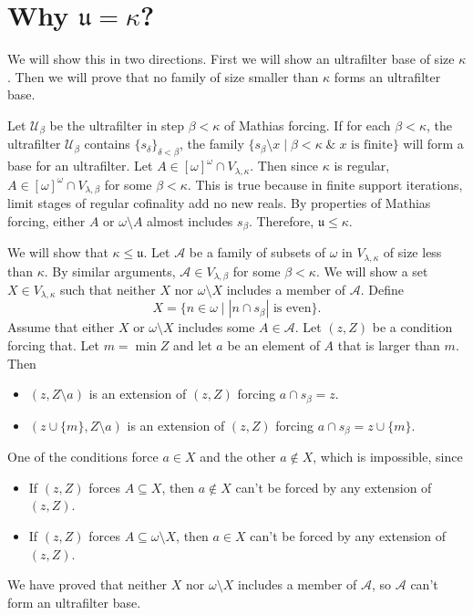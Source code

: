 \documentclass[12pt]{article}\usepackage[english]{babel}
\newcommand{\logand}{\; \& \;}
\newcommand{\calA}{\mathcal{A}}
\newcommand{\calU}{\mathcal{U}}
\newcommand{\ufnumber}{\mathfrak{u}}
\theoremstyle{definition}
\theoremstyle{remark}
\begin{document}
\section*{Why $\ufnumber = \kappa$?}

We will show this in two directions.
First we will show an ultrafilter base of size $\kappa$.
Then we will prove that no family of size smaller than $\kappa$ forms an ultrafilter base.

Let $\calU_\beta$ be the ultrafilter in step $\beta < \kappa$ of Mathias forcing.
If for each $\beta < \kappa$, the ultrafilter $\calU_\beta$ contains $\{ s_\delta \}_{\delta < \beta}$, the family $\{ s_\beta \setminus x \mid \beta < \kappa \logand x \text{ is finite} \}$ will form a base for an ultrafilter.
Let $A \in [\omega]^\omega \cap V_{\lambda, \kappa}$.
Then since $\kappa$ is regular, $A \in [\omega]^\omega \cap V_{\lambda, \beta}$ for some $\beta < \kappa$.
This is true because in finite support iterations, limit stages of regular cofinality add no new reals.
By properties of Mathias forcing, either $A$ or $\omega \setminus A$ almost includes $s_\beta$.
Therefore, $\ufnumber \leq \kappa$.

We will show that $\kappa \leq \ufnumber$.
Let $\calA$ be a family of subsets of $\omega$ in $V_{\lambda, \kappa}$ of size less than $\kappa$.
By similar arguments, $\calA \in V_{\lambda, \beta}$ for some $\beta < \kappa$.
We will show a set $X \in V_{\lambda, \kappa}$ such that neither $X$ nor $\omega \setminus X$ includes a member of $\calA$.
Define
\[
  X = \{ n \in \omega \mid |n \cap s_\beta| \text{ is even} \}.
\]
Assume that either $X$ or $\omega \setminus X$ includes some $A \in \calA$.
Let $(z, Z)$ be a condition forcing that.
Let $m = \min Z$ and let $a$ be an element of $A$ that is larger than $m$.
Then
\begin{itemize}
  \item $(z, Z \setminus a)$ is an extension of $(z, Z)$ forcing $a \cap s_\beta = z$.
  \item $(z \cup \{ m \}, Z \setminus a)$ is an extension of $(z, Z)$ forcing $a \cap s_\beta = z \cup \{ m \}$.
\end{itemize}
One of the conditions force $a \in X$ and the other $a \notin X$, which is impossible, since
\begin{itemize}
  \item If $(z, Z)$ forces $A \subseteq X$, then $a \notin X$ can't be forced by any extension of $(z, Z)$.
  \item If $(z, Z)$ forces $A \subseteq \omega \setminus X$, then $a \in X$ can't be forced by any extension of $(z, Z)$.
\end{itemize}
We have proved that neither $X$ nor $\omega \setminus X$ includes a member of $\calA$, so $\calA$ can't form an ultrafilter base.
\end{document}
